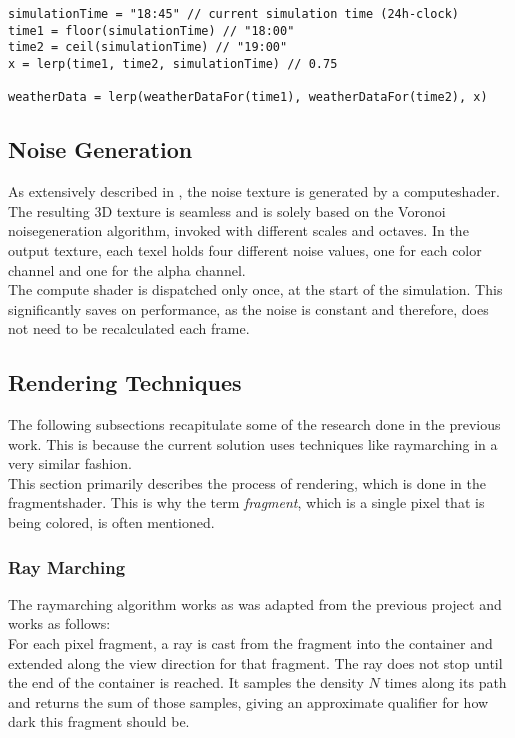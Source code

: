 \begin{lstlisting}[language=HLSL, caption=Pseudo-code for linear interpolation of weather data., label=lst:psuedo:weather:lerp]
simulationTime = "18:45" // current simulation time (24h-clock)
time1 = floor(simulationTime) // "18:00"
time2 = ceil(simulationTime) // "19:00"
x = lerp(time1, time2, simulationTime) // 0.75

weatherData = lerp(weatherDataFor(time1), weatherDataFor(time2), x)
\end{lstlisting}

\clearpage

\subsection{Noise Generation}
\label{section:techimpl:noise}
As extensively described in , the \gls{noise} texture is generated by a \gls{computeshader}.
The resulting 3D texture is seamless and is solely based on the Voronoi \gls{noisegeneration} algorithm, invoked with different scales and octaves.
In the output texture, each \gls{texel} holds four different \gls{noise} values, one for each color channel and one for the alpha channel.
\\
The compute shader is dispatched only once, at the start of the simulation.
This significantly saves on performance, as the \gls{noise} is constant and therefore, does not need to be recalculated each frame.

\subsection{Rendering Techniques}
The following subsections recapitulate some of the research done in the previous work.
This is because the current solution uses techniques like \gls{raymarching} in a very similar fashion.
\\
This section primarily describes the process of rendering, which is done in the \gls{fragmentshader}.
This is why the term \emph{\gls{fragment}}, which is a single pixel that is being colored, is often mentioned. 

\subsubsection{Ray Marching}
The \gls{raymarching} algorithm works as was adapted from the previous project and works as follows:
\\
For each pixel \gls{fragment}, a ray is cast from the \gls{fragment} into the container and extended along the view direction for that \gls{fragment}.
The ray does not stop until the end of the container is reached.
It samples the density $N$ times along its path and returns the sum of those samples, giving an approximate qualifier for how dark this \gls{fragment} should be.

